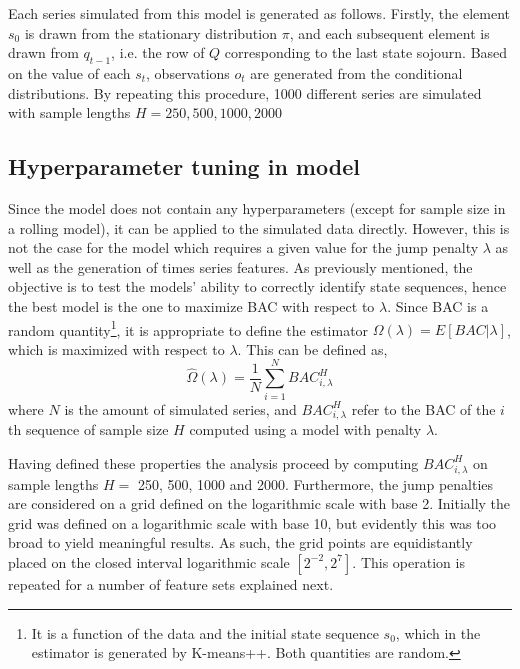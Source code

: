 Each series simulated from this model is generated as follows. Firstly, the element $s_0$ is drawn from the stationary distribution $\pi$, and each subsequent element is drawn from $q_{t-1}$, i.e. the row of $Q$ corresponding to the last state sojourn. Based on the value of each $s_t$, observations $o_t$ are generated from the conditional distributions. By repeating this procedure, 1000 different series are simulated with sample lengths $H = 250, 500, 1000, 2000$

\subsection{Hyperparameter tuning in \jump model}
\label{subsection: jump_penalizer}
Since the \mle model does not contain any hyperparameters (except for sample size in a rolling model), it can be applied to the simulated data directly. However, this is not the case for the \jump model which requires a given value for the jump penalty $\lambda$ as well as the generation of times series features. As previously mentioned, the objective is to test the models' ability to correctly identify state sequences, hence the best \jump model is the one to maximize BAC with respect to $\lambda$. Since BAC is a random quantity\footnote
{It is a function of the data and the initial state sequence $s_0$, which in the \jump estimator is generated by K-means++. Both quantities are random.},
it is appropriate to define the estimator $\Omega(\lambda)= E[BAC|\lambda]$, which is maximized with respect to $\lambda$. This can be defined as, 
\begin{equation}
    \hat\Omega(\lambda) = \frac{1}{N} \sum_{i=1}^N BAC_{i, \lambda}^H
\end{equation}
where $N$ is the amount of simulated series, and $BAC_{i, \lambda}^H$ refer to the BAC of the $i$th sequence of sample size $H$ computed using a \jump model with penalty $\lambda$.

Having defined these properties the analysis proceed by computing $BAC_{i, \lambda}^H$ on sample lengths $H =$ 250, 500, 1000 and 2000. Furthermore, the jump penalties are considered on a grid defined on the logarithmic scale with base 2. Initially the grid was defined on a logarithmic scale with base 10, but evidently this was too broad to yield meaningful results. As such, the grid points are equidistantly placed on the closed interval logarithmic scale $[2^{-2}, 2^{7}]$. This operation is repeated for a number of feature sets explained next.


